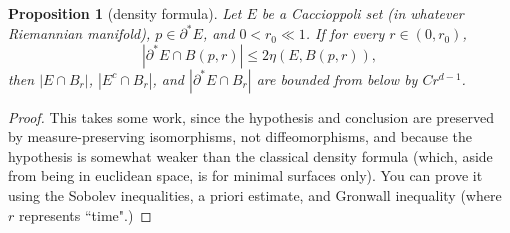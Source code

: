 \documentclass[reqno,12pt,letterpaper]{amsart}
\newtheorem{proposition}[theorem]{Proposition}
\theoremstyle{definition}
\numberwithin{equation}{section}
\begin{document}
\begin{proposition}[density formula]
Let $E$ be a Caccioppoli set (in whatever Riemannian manifold), $p \in \partial^* E$, and $0 < r_0 \ll 1$.
If for every $r \in (0, r_0)$,
$$|\partial^* E \cap B(p, r)| \leq 2\eta(E, B(p, r)),$$
then
$|E \cap B_r|$, $|E^c \cap B_r|$, and $|\partial^* E \cap B_r|$ are bounded from below by $Cr^{d - 1}$.
\end{proposition}
\begin{proof}
This takes some work, since the hypothesis and conclusion are preserved by measure-preserving isomorphisms, not diffeomorphisms, and because the hypothesis is somewhat weaker than the classical density formula (which, aside from being in euclidean space, is for minimal surfaces only).
You can prove it using the Sobolev inequalities, a priori estimate, and Gronwall inequality (where $r$ represents ``time".)
\end{proof}
\end{document}

